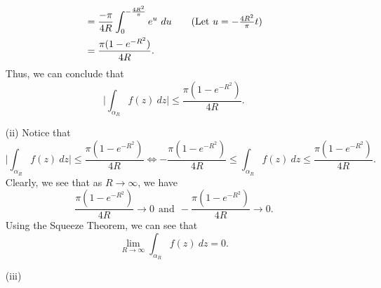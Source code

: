 \documentclass[a4paper]{article}
\begin{document}
\begin{solution}
\begin{enumerate}
\begin{align*}
                                                              &= \frac{ -\pi  }{ 4R } \int_{ 0 }^{ - \frac{ 4 R^{2} }{ \pi  }  }  e^{u} \ du \tag{Let \( u = - \frac{ 4 R^{2} }{ \pi  } t  \)} \\
                                                              &= \frac{ \pi (1 - e^{- R^{2}}) }{ 4R }.
        \end{align*}
        Thus, we can conclude that
        \[  \Big| \int_{ {\alpha}_{R} }^{  } f(z) \ dz \Big| \leq \frac{ \pi (1 - e^{- R^{2}}) }{ 4R }. \]
        \item[(ii)] Notice that 
            \[  \Big| \int_{ {\alpha}_{R} }^{  } f(z) \ dz  \Big|  \leq \frac{ \pi (1 - e^{- R^{2}}) }{ 4R  } \iff - \frac{ \pi (1 - e^{- R^{2}}) }{ 4 R  }  \leq \int_{ {\alpha}_{R} }^{  } f(z) \ dz \leq \frac{ \pi (1 - e^{-R^{2}}) }{ 4R }. \]
            Clearly, we see that as \( R \to \infty   \), we have
            \[  \frac{ \pi (1 - e^{- R^{2}}) }{ 4R  } \to 0 \ \ \text{and} \ \ - \frac{ \pi (1 - e^{- R^{2}}) }{ 4 R  } \to 0.  \]
            Using the Squeeze Theorem, we can see that
            \[  \lim_{ R \to \infty  }  \int_{ {\alpha}_{R} }^{  } f(z) \ dz = 0.  \]
        \item[(iii)] 


\end{enumerate}
\end{solution}
\end{document}
